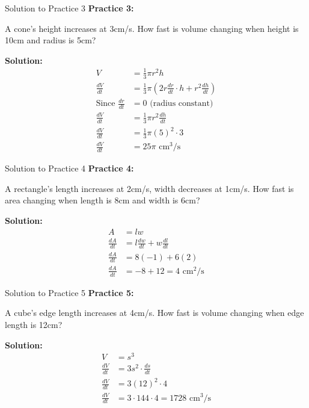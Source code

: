 \documentclass[aspectratio=169]{beamer}
\begin{document}
\begin{frame}{Solution to Practice 3}
\textbf{Practice 3:}

A cone's height increases at 3cm/s. How fast is volume changing when height is 10cm and radius is 5cm?

\textbf{Solution:}
\[
\begin{aligned}
  V &= \frac{1}{3}\pi r^2 h \\
  \frac{dV}{dt} &= \frac{1}{3}\pi(2r\frac{dr}{dt} \cdot h + r^2\frac{dh}{dt}) \\
  \text{Since } \frac{dr}{dt} &= 0 \text{ (radius constant)} \\
  \frac{dV}{dt} &= \frac{1}{3}\pi r^2 \frac{dh}{dt} \\
  \frac{dV}{dt} &= \frac{1}{3}\pi(5)^2 \cdot 3 \\
  \frac{dV}{dt} &= 25\pi \text{ cm}^3\text{/s}
\end{aligned}
\]
\end{frame}

\begin{frame}{Solution to Practice 4}
\textbf{Practice 4:}

A rectangle's length increases at 2cm/s, width decreases at 1cm/s. How fast is area changing when length is 8cm and width is 6cm?

\textbf{Solution:}
\[
\begin{aligned}
  A &= lw \\
  \frac{dA}{dt} &= l\frac{dw}{dt} + w\frac{dl}{dt} \\
  \frac{dA}{dt} &= 8(-1) + 6(2) \\
  \frac{dA}{dt} &= -8 + 12 = 4 \text{ cm}^2\text{/s}
\end{aligned}
\]
\end{frame}

\begin{frame}{Solution to Practice 5}
\textbf{Practice 5:}

A cube's edge length increases at 4cm/s. How fast is volume changing when edge length is 12cm?

\textbf{Solution:}
\[
\begin{aligned}
  V &= s^3 \\
  \frac{dV}{dt} &= 3s^2 \cdot \frac{ds}{dt} \\
  \frac{dV}{dt} &= 3(12)^2 \cdot 4 \\
  \frac{dV}{dt} &= 3 \cdot 144 \cdot 4 = 1728 \text{ cm}^3\text{/s}
\end{aligned}
\]
\end{frame}
\end{document}
